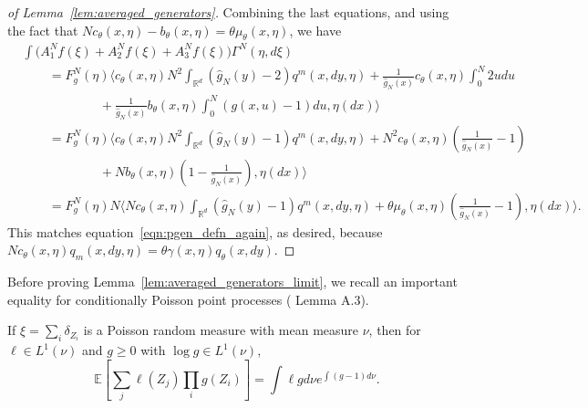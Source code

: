 \documentclass[EJP]{ejpecp} %
\renewcommand{\hat}{\widehat}
\newcommand{\IE}{\mathbb E}
\newcommand{\IR}{\mathbb R}
\newcommand{\lp}{\xi}              %
\begin{document}
\begin{proof}[of Lemma~\ref{lem:averaged_generators}]
Combining the last equations,
and using the fact that
$N c_\theta(x,\eta) - b_\theta(x,\eta) = \theta \mu_\theta(x,\eta)$,
we have 
\begin{align*}
&
    \int \Bigg( A^N_1 f(\xi) + A^N_2 f(\xi) + A^N_3 f(\xi) \Bigg) \Gamma^N(\eta,d\lp)
\\ &\qquad =
    F_g^N(\eta) \bigg\langle
        c_\theta(x,\eta) N^2 \int_{\IR^d} (\hat g_N(y) - 2) q^m(x,dy,\eta)
        +
        \frac{1}{\hat g_N(x)} c_\theta(x,\eta) \int_0^N 2u du
\\ &\qquad \qquad \qquad {}
        +
        \frac{1}{\hat g_N(x)} b_\theta(x,\eta) \int_0^N (g(x,u) - 1) du
    , \eta(dx) \bigg\rangle 
\\ &\qquad =
    F_g^N(\eta) \bigg\langle
        c_\theta(x,\eta) N^2 \int_{\IR^d} (\hat g_N(y) - 1) q^m(x,dy,\eta)
        +
        N^2 c_\theta(x,\eta) \left(\frac{1}{\hat g_N(x)} - 1\right)
\\ &\qquad \qquad \qquad {}
        +
        N b_\theta(x,\eta) \left(1 - \frac{1}{\hat g_N(x)}\right)
    , \eta(dx) \bigg\rangle 
\\ &\qquad =
    F_g^N(\eta) N \bigg\langle
        N c_\theta(x,\eta) \int_{\IR^d} (\hat g_N(y) - 1) q^m(x,dy,\eta)
        +
        \theta \mu_\theta(x,\eta) \left(\frac{1}{\hat g_N(x)} - 1\right)
    , \eta(dx) \bigg\rangle  .
\end{align*}
This matches equation~\eqref{eqn:pgen_defn_again}, as desired,
because $N c_\theta(x,\eta) q_m(x,dy,\eta) = \theta \gamma(x,\eta) q_\theta(x,dy)$.
\end{proof}

Before proving Lemma~\ref{lem:averaged_generators_limit},
we recall an important equality for conditionally
Poisson point processes (\cite{kurtz/rodrigues:2011} Lemma A.3).

\begin{lemma} \label{lem:poisson_eqn}
If $\lp = \sum_{i}\delta_{Z_i}$ is a Poisson random measure with mean measure $\nu$, 
then for $\ell \in L^{1}(\nu)$ and $g\geq0$ with $\log g \in L^{1}(\nu)$,
\begin{equation}
\IE\left[\sum_{j} \ell(Z_j) \prod_{i}g(Z_i)\right] = \int \ell g d\nu e^{\int (g-1) d \nu}.
\end{equation}
\end{lemma}
\end{document}

